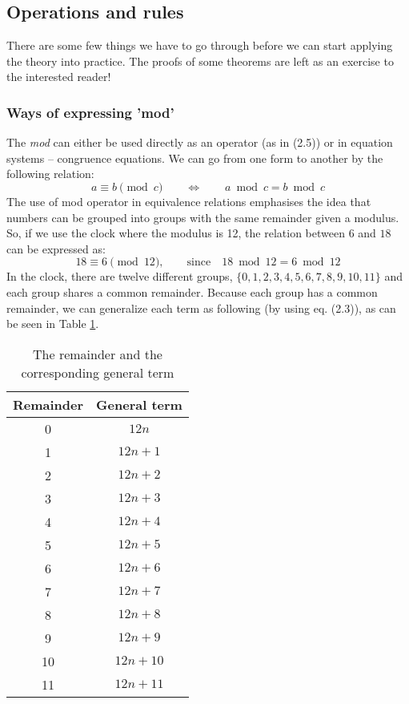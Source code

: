 \subsection{Operations and rules}
There are some few things we have to go through before we can start applying the theory into practice. The proofs of some theorems are left as an exercise to the interested reader!
\subsubsection{Ways of expressing 'mod'}
The \textit{mod} can either be used directly as an operator (as in (2.5)) or in equation systems -- congruence equations. We can go from one form to another by the following relation: 
\begin{equation}
a \equiv b \pmod c \qquad \iff \qquad a \bmod c = b \bmod c
\end{equation}
The use of mod operator in equivalence relations emphasises the idea that numbers can be grouped into groups with the same remainder given a modulus. So, if we use the clock where the modulus is 12, the relation between $6$ and $18$ can be expressed as:
\begin{equation*}
18 \equiv 6 \pmod {12}, \qquad \text{since} \quad 18 \bmod{12} = 6 \bmod{12}
\end{equation*}
In the clock, there are twelve different groups, $\{0,1,2,3,4,5,6,7,8,9,10,11\}$ and each group shares a common remainder. Because each group has a common remainder, we can generalize each term as following (by using eq. (2.3)), as can be seen in Table \ref{TableMod12}. 
\begin{table}
\begin{center}
\begin{tabular}{|c|c|}
\hline
Remainder & General term \\
\hline
0 & $12n$ \\
1 & $12n+1$ \\
2 & $12n+2$ \\
3 & $12n+3$ \\
4 & $12n+4$ \\
5 & $12n+5$ \\
6 & $12n+6$ \\
7 & $12n+7$ \\
8 & $12n+8$ \\
9 & $12n+9$ \\
10 & $12n+10$ \\
11 & $12n+11$ \\
\hline
\end{tabular}
\end{center}
\caption{The remainder and the corresponding general term}
\label{TableMod12}
\end{table}

